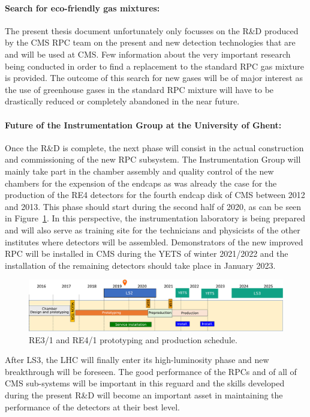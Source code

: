 	\paragraph*{Search for eco-friendly gas mixtures:} The present thesis document unfortunately only focusses on the R\&D produced by the CMS RPC team on the present and new detection technologies that are and will be used at CMS. Few information about the very important research being conducted in order to find a replacement to the standard RPC gas mixture is provided. The outcome of this search for new gases will be of major interest as the use of greenhouse gases in the standard RPC mixture will have to be drastically reduced or completely abandoned in the near future.
	
	\paragraph*{Future of the Instrumentation Group at the University of Ghent:} Once the R\&D is complete, the next phase will consist in the actual construction and commissioning of the new RPC subsystem. The Instrumentation Group will mainly take part in the chamber assembly and quality control of the new chambers for the expension of the endcaps as was already the case for the production of the RE4 detectors for the fourth endcap disk of CMS between 2012 and 2013. This phase should start during the second half of 2020, as can be seen in Figure~\ref{fig:milestones}. In this perspective, the instrumentation laboratory is being prepared and will also serve as training site for the technicians and physicists of the other institutes where detectors will be assembled. Demonstrators of the new improved RPC will be installed in CMS during the \acl{YETS} of winter 2021/2022 and the installation of the remaining detectors should take place in January 2023.
	
	\begin{figure}[H]
	    \centering
	    \includegraphics[width=\linewidth]{fig/chapt7/CMS-RPC-Milestones.pdf}
	    \caption{\label{fig:milestones} RE3/1 and RE4/1 prototyping and production schedule.}
	\end{figure}
	
	After LS3, the LHC will finally enter its high-luminosity phase and new breakthrough will be foreseen. The good performance of the RPCs and of all of CMS sub-systems will be important in this reguard and the skills developed during the present R\&D will become an important asset in maintaining the performance of the detectors at their best level.

\clearpage{\pagestyle{empty}\cleardoublepage}